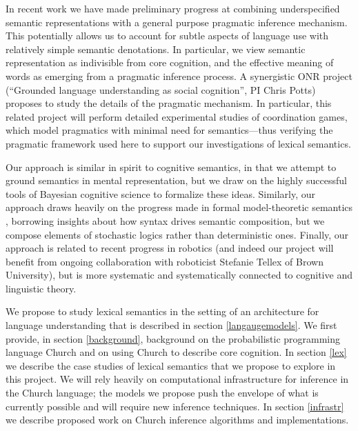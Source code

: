 \documentclass[12pt]{article}
\begin{document}
In recent work we have made preliminary progress at combining underspecified semantic representations with a general purpose pragmatic inference mechanism.
This potentially allows us to account for subtle aspects of language use with relatively simple semantic denotations.
In particular, we view semantic representation as indivisible from core cognition, and the effective meaning of words as emerging from a pragmatic inference process. A synergistic ONR project (``Grounded language understanding as social cognition'', PI Chris Potts) proposes to study the details of the pragmatic mechanism. In particular, this related project will perform detailed experimental studies of coordination games, which model pragmatics with minimal need for semantics---thus verifying the pragmatic framework used here to support our investigations of lexical semantics.

Our approach is similar in spirit to cognitive semantics, in that we attempt to ground semantics in mental representation, but we draw on the highly successful tools of Bayesian cognitive science to formalize these ideas. 
Similarly, our approach draws heavily on the progress made in formal model-theoretic semantics \cite{montague1973,heimkratzer1998}, borrowing insights about how syntax drives semantic composition, but we compose elements of stochastic logics rather than deterministic ones.
Finally, our approach is related to recent progress in robotics (and indeed our project will benefit from ongoing collaboration with roboticist Stefanie Tellex of Brown University), but is more systematic and systematically connected to cognitive and linguistic theory. 

We propose to study lexical semantics in the setting of an architecture for language understanding that is described in section \ref{langaugemodels}. We first provide, in section \ref{background}, background on the probabilistic programming language Church and on using Church to describe core cognition. In section \ref{lex} we describe the case studies of lexical semantics that we propose to explore in this project. We will rely heavily on computational infrastructure for inference in the Church language; the models we propose push the envelope of what is currently possible and will require new inference techniques. In section \ref{infrastr} we describe proposed work on Church inference algorithms and implementations.
\end{document}
